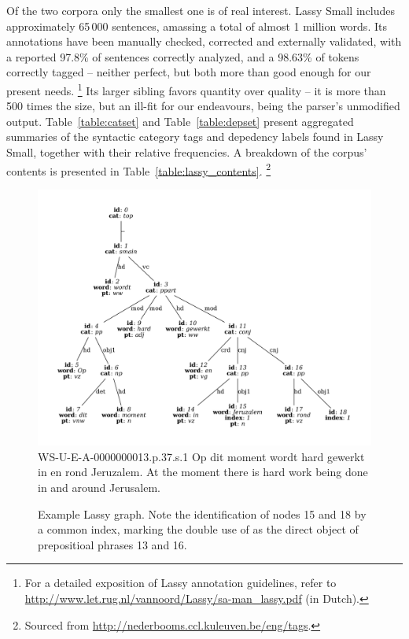 Of the two corpora only the smallest one is of real interest.
Lassy Small includes approximately 65\,000 sentences, amassing a total of almost 1 million words. 
Its annotations have been manually checked, corrected and externally validated, with a reported 97.8\% of sentences correctly analyzed, and a 98.63\% of tokens correctly tagged -- neither perfect, but both more than good enough for our present needs.%
	\footnote{For a detailed exposition of Lassy annotation guidelines, refer to \url{http://www.let.rug.nl/vannoord/Lassy/sa-man_lassy.pdf} (in Dutch).}
Its larger sibling favors quantity over quality -- it is more than 500 times the size, but an ill-fit for our endeavours, being the parser's unmodified output.
Table~\ref{table:catset} and Table~\ref{table:depset} present aggregated summaries of the syntactic category tags and depedency labels found in Lassy Small, together with their relative frequencies. 
A breakdown of the corpus' contents is presented in Table~\ref{table:lassy_contents}.%
\footnote{Sourced from \url{http://nederbooms.ccl.kuleuven.be/eng/tags}.}

\begin{figure}
	\includegraphics[width=1\textwidth,trim={1.25cm 0 1.25cm 0}, clip]{./prebuilt/parse_example.pdf}
	\lassycap
		{WS-U-E-A-0000000013.p.37.s.1}
		{Op dit moment wordt hard gewerkt in en rond Jeruzalem.}
		{At the moment there is hard work being done in and around Jerusalem.}
	\caption{Example Lassy graph. Note the identification of nodes 15 and 18 by a common index, marking the double use of  as the direct object of prepositioal phrases 13 and 16.}
	\label{figure:example_lassy_tree}
\end{figure}

